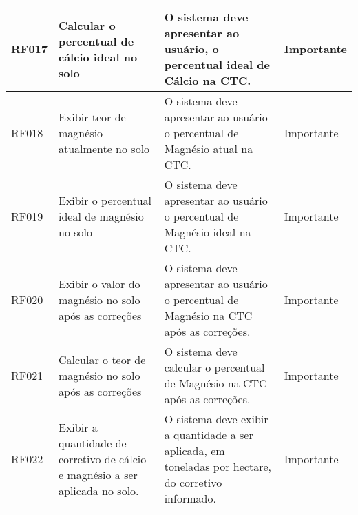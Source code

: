 \begin{landscape}
\begin{longtable}{|p{1.5cm}|p{5cm}|p{9cm}|p{2.5cm}|}
    RF017 & Calcular o percentual de cálcio ideal no solo                                    & O sistema deve apresentar ao usuário, o percentual ideal de Cálcio na CTC.                                                                                                                                                                                                                              & Importante  \\\hline
    RF018 & Exibir teor de magnésio atualmente no solo                                       & O sistema deve apresentar ao usuário o percentual de Magnésio atual na CTC.                                                                                                                                                                                                                             & Importante  \\\hline
    RF019 & Exibir o percentual ideal de magnésio no solo                                    & O sistema deve apresentar ao usuário o percentual de Magnésio ideal na CTC.                                                                                                                                                                                                                             & Importante  \\\hline
    RF020 & Exibir o valor do magnésio no solo após as correções                             & O sistema deve apresentar ao usuário o percentual de Magnésio na CTC após as correções.                                                                                                                                                                                                                 & Importante  \\\hline
    RF021 & Calcular o teor de magnésio no solo após as correções                            & O sistema deve calcular o percentual de Magnésio na CTC após as correções.                                                                                                                                                                                                                              & Importante  \\\hline
    RF022 & Exibir a quantidade de corretivo de cálcio e magnésio a ser aplicada no solo.    & O sistema deve exibir a quantidade a ser aplicada, em toneladas por hectare, do corretivo informado.                                                                                                                                                                                                    & Importante  \\\hline

\end{longtable}
\end{landscape}
